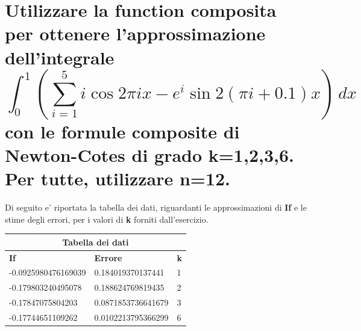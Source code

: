 \documentclass[10pt,a4paper]{article}
\begin{document}
\section{
Utilizzare la function \textbf{composita} per ottenere l'approssimazione dell'integrale
$$
  \int_{0}^{1}
  (\sum_{i=1}^{5} i \cos 2 \pi ix - e^i \sin 2(\pi i + 0.1)x)
  \, dx
$$
con le formule composite di Newton-Cotes di grado \textbf{k=1,2,3,6}. Per tutte, utilizzare \textbf{n=12}.
}

Di seguito e' riportata la tabella dei dati, riguardanti le approssimazioni di \textbf{If}
e le stime degli errori, per i valori di \textbf{k} forniti dall'esercizio.
\\
\begin{center}
  \begin{tabular}{ |p{3.7cm}|p{3cm}|p{0.5cm}| }
    \hline
    \multicolumn{3}{|c|}{ \textbf{Tabella dei dati}} \\
    \hline
    \textbf{If} & \textbf{Errore} & \textbf{k}      \\
    \hline
    -0.0925980476169039 & 0.184019370137441 & 1 \\
    -0.179803240495078  & 0.188624769819435 & 2 \\
    -0.17847075804203  & 0.0871853736641679 & 3 \\
    -0.17744651109262 & 0.0102213795366299 & 6 \\
    \hline
  \end{tabular}
\end{center}
\end{document}
